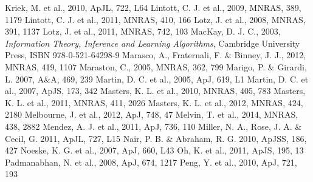 \documentclass[useAMS,usenatbib]{mn2e}
\begin{document}
\begin{thebibliography}{}
 Kriek, M. et al., 2010, ApJL, 722, L64
 Lintott, C. J. et al., 2009, MNRAS, 389, 1179
 Lintott, C. J. et al., 2011, MNRAS, 410, 166
 Lotz, J. et al., 2008, MNRAS, 391, 1137
 Lotz, J. et al., 2011, MNRAS, 742, 103
 MacKay, D. J. C., 2003, \emph{Information Theory, Inference and Learning Algorithms}, Cambridge University Press, ISBN 978-0-521-64298-9
 Marasco, A., Fraternali, F. \& Binney, J. J., 2012, MNRAS, 419, 1107
 Maraston, C., 2005, MNRAS, 362, 799
 Marigo, P. \& Girardi, L. 2007, A\&A, 469, 239
 Martin, D. C. et al., 2005, ApJ, 619, L1
 Martin, D. C. et al., 2007, ApJS, 173, 342
 Masters, K. L. et al., 2010, MNRAS, 405, 783
 Masters, K. L. et al., 2011, MNRAS, 411, 2026
 Masters, K. L. et al., 2012, MNRAS, 424, 2180
 Melbourne, J. et al., 2012, ApJ, 748, 47
 Melvin, T. et al., 2014, MNRAS, 438, 2882
 Mendez, A. J. et al., 2011, ApJ, 736, 110
 Miller, N. A., Rose, J. A. \& Cecil, G. 2011, ApJL, 727, L15
 Nair, P. B. \& Abraham, R. G. 2010, ApJSS, 186, 427 
 Noeske, K. G. et al., 2007, ApJ, 660, L43
 Oh, K. et al., 2011, ApJS, 195, 13
 Padmanabhan, N. et al., 2008, ApJ, 674, 1217
 Peng, Y. et al., 2010, ApJ, 721, 193

\end{thebibliography}
\end{document}
